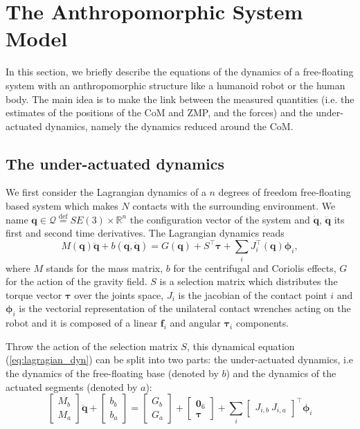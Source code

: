 \section{The Anthropomorphic System Model}
\label{sec:dynamics}

In this section, we briefly describe the equations of the dynamics of a free-floating system with an anthropomorphic structure like a humanoid robot or the human body. The main idea is to make the link between the measured quantities (i.e. the estimates of the positions of the CoM and ZMP, and the forces) and the under-actuated dynamics, namely the dynamics reduced around the CoM.

\subsection{The under-actuated dynamics}

We first consider the Lagrangian dynamics of a $n$ degrees of freedom free-floating based system which makes $N$ contacts with the surrounding environment. We name $\bm q \in \mathcal{Q} \overset{\text{def}}{=}  SE(3) \times \mathbb{R}^{n}$ the configuration vector of the system and $\dot{\bm q}$, $\ddot{\bm q}$ its first and second time derivatives. The Lagrangian dynamics reads
\begin{equation}
M(\bm q)\ddot{\bm q}
+
b(\bm q, \dot{\bm q})
= G(\bm q) +
S^{\top} \bm \tau + \sum_{i} J_{i}^{\top}(\bm q)\bm \phi_{i},
\label{eq:lagragian_dyn}
\end{equation}
where $M$ stands for the mass matrix, $b$ for the centrifugal and Coriolis effects, $G$ for the action of the gravity field. $S$ is a selection matrix which distributes the torque vector $\bm \tau$ over the joints space, $J_{i}$ is the jacobian of the contact point $i$ and $\bm \phi_{i}$ is the vectorial representation of the unilateral contact wrenches \cite{brogliato2012nonsmooth} acting on the robot and it is composed of a linear $\bm f_{i}$ and angular $\bm \tau_{i}$ components.

Throw the action of the selection matrix $S$, this dynamical equation (\ref{eq:lagragian_dyn}) can be split into two parts: the under-actuated dynamics, i.e the dynamics of the free-floating base (denoted by $b$) and the dynamics of the actuated segments (denoted by $a$):
\begin{equation}
\begin{bmatrix}
M_{b}\\
M_{a}
\end{bmatrix}
\ddot{\bm q}
+
\begin{bmatrix}
b_{b} \\
b_{a}
\end{bmatrix}
=
\begin{bmatrix}
G_{b} \\
G_{a}
\end{bmatrix}
+
\begin{bmatrix}
\bm 0_{6} \\
\bm \tau
\end{bmatrix}
+
\sum_{i}
\begin{bmatrix}
J_{i,b} ~ J_{i,a}
\end{bmatrix}^{\top} \bm \phi_{i}
\label{eq:split_dynamics}
\end{equation}

